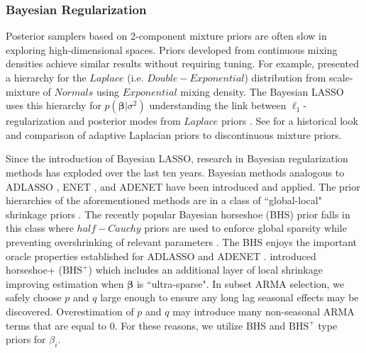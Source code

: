 \subsubsection{Bayesian Regularization}
Posterior samplers based on 2-component mixture priors are often slow in exploring high-dimensional spaces. Priors developed from continuous mixing densities achieve similar results without requiring tuning. For example, \cite{Andrews1974} presented a hierarchy for the $Laplace$ (i.e. $Double-Exponential$) distribution from scale-mixture of $Normals$ using $Exponential$ mixing density. The Bayesian LASSO \citep{Park2008,Hans2009} uses this hierarchy for $p(\bm{\beta}|\sigma^2)$ understanding the link between $\ell_1$-regularization and posterior modes from $Laplace$ priors \citep{Tibshirani1996}. See \cite{OHara2009} for a historical look and comparison of adaptive Laplacian priors to discontinuous mixture priors.

Since the introduction of Bayesian LASSO, research in Bayesian regularization methods has exploded over the last ten years. Bayesian methods analogous to ADLASSO \citep{Leng2014}, ENET \citep{Li2010a}, and ADENET \citep{Stankiewicz2015} have been introduced and applied. The prior hierarchies of the aforementioned methods are in a class of ``global-local" shrinkage priors \citep{Polson2010}. The recently popular Bayesian horseshoe (BHS) prior falls in this class where $half-Cauchy$ priors are used to enforce global sparsity while preventing overshrinking of relevant parameters \citep{Carvalho2009,Carvalho2010}. The BHS enjoys the important oracle properties established for ADLASSO and ADENET \citep{Datta2015}. \cite{Bhadra2016} introduced horseshoe+ ($\textrm{BHS}^+$) which includes an additional layer of local shrinkage improving estimation when $\bm{\beta}$ is ``ultra-sparse". In subset ARMA selection, we safely choose $p$ and $q$ large enough to ensure any long lag seasonal effects may be discovered. Overestimation of $p$ and $q$ may introduce many non-seasonal ARMA terms that are equal to 0.  For these reasons, we utilize BHS and $\textrm{BHS}^+$ type priors for $\beta_i$. 

